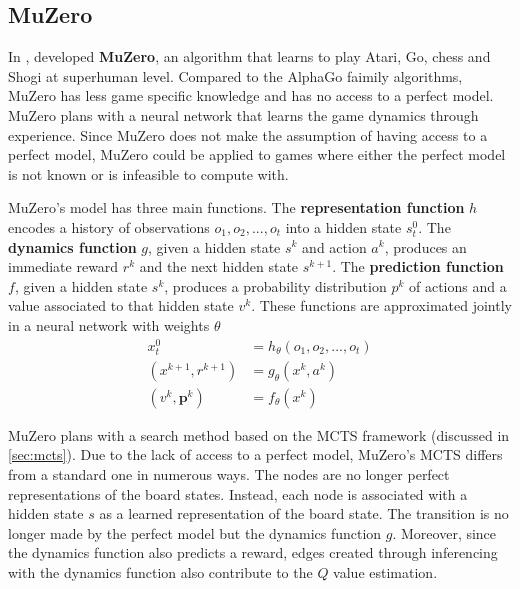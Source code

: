 \subsection{MuZero} \label{sec:muzero}
In \citeyear{MasteringAtariGo_Schrittwieser.Antonoglou.ea_2020},
\citeauthor{MasteringAtariGo_Schrittwieser.Antonoglou.ea_2020} developed
\textbf{MuZero}, an algorithm that learns to play Atari, Go, chess and Shogi at superhuman level.
Compared to the AlphaGo faimily algorithms,
MuZero has less game specific knowledge and has no access to a perfect model.
MuZero plans with a neural network that learns the game dynamics through experience.
Since MuZero does not make the assumption of having access to a perfect model,
MuZero could be applied to games where either the perfect model is not known or is infeasible to compute with.

MuZero's model has three main functions.
The \textbf{representation function} $h$ encodes a history of observations $o_1, o_2, ..., o_t$ into a hidden state $s_t^0$.
The \textbf{dynamics function} $g$,
given a hidden state $s^k$ and action $a^k$, produces an immediate reward $r^k$ and the next hidden state $s^{k+1}$.
The \textbf{prediction function} $f$,
given a hidden state $s^k$, produces a probability distribution $p^k$ of actions and a value associated to that hidden state $v^k$.
These functions are approximated jointly in a neural network with weights $\theta$
\begin{align}
    x^0_t               & = h_{\theta}(o_1, o_2, ..., o_t) \label{eq:muzero_h}  \\
    (x^{k+1}, r^{k+1})  & = g_{\theta}(x^k, a^k)  \label{eq:muzero_g}  \\
    (v^k, \pmb{p}^k)    & = f_{\theta}(x^k) \label{eq:muzero_f}
\end{align}

MuZero plans with a search method based on the MCTS framework (discussed in \ref{sec:mcts}).
Due to the lack of access to a perfect model, MuZero's MCTS differs from a standard one in numerous ways.
The nodes are no longer perfect representations of the board states.
Instead, each node is associated with a hidden state $s$ as a learned representation of the board state.
The transition is no longer made by the perfect model but the dynamics function $g$.
Moreover, since the dynamics function also predicts a reward, edges created through inferencing with the dynamics function also contribute to the $Q$ value estimation.

